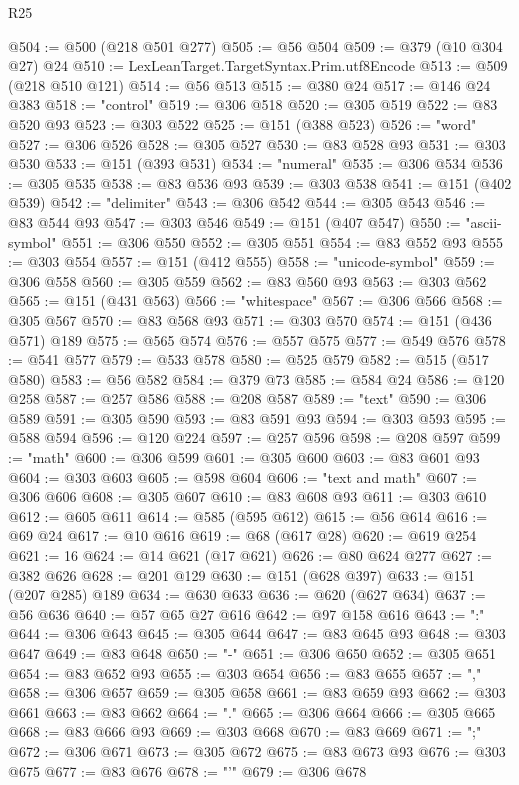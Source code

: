 \begin{lexlean}{R25}
\begin{coremodule}
@504 := @500 (@218 @501 @277)
@505 := @56 @504
@509 := @379 (@10 @304 @27) @24
@510 := LexLeanTarget.TargetSyntax.Prim.utf8Encode
@513 := @509 (@218 @510 @121)
@514 := @56 @513
@515 := @380 @24
@517 := @146 @24 @383
@518 := "control"
@519 := @306 @518
@520 := @305 @519
@522 := @83 @520 @93
@523 := @303 @522
@525 := @151 (@388 @523)
@526 := "word"
@527 := @306 @526
@528 := @305 @527
@530 := @83 @528 @93
@531 := @303 @530
@533 := @151 (@393 @531)
@534 := "numeral"
@535 := @306 @534
@536 := @305 @535
@538 := @83 @536 @93
@539 := @303 @538
@541 := @151 (@402 @539)
@542 := "delimiter"
@543 := @306 @542
@544 := @305 @543
@546 := @83 @544 @93
@547 := @303 @546
@549 := @151 (@407 @547)
@550 := "ascii-symbol"
@551 := @306 @550
@552 := @305 @551
@554 := @83 @552 @93
@555 := @303 @554
@557 := @151 (@412 @555)
@558 := "unicode-symbol"
@559 := @306 @558
@560 := @305 @559
@562 := @83 @560 @93
@563 := @303 @562
@565 := @151 (@431 @563)
@566 := "whitespace"
@567 := @306 @566
@568 := @305 @567
@570 := @83 @568 @93
@571 := @303 @570
@574 := @151 (@436 @571) @189
@575 := @565 @574
@576 := @557 @575
@577 := @549 @576
@578 := @541 @577
@579 := @533 @578
@580 := @525 @579
@582 := @515 (@517 @580)
@583 := @56 @582
@584 := @379 @73
@585 := @584 @24
@586 := @120 @258
@587 := @257 @586
@588 := @208 @587
@589 := "text"
@590 := @306 @589
@591 := @305 @590
@593 := @83 @591 @93
@594 := @303 @593
@595 := @588 @594
@596 := @120 @224
@597 := @257 @596
@598 := @208 @597
@599 := "math"
@600 := @306 @599
@601 := @305 @600
@603 := @83 @601 @93
@604 := @303 @603
@605 := @598 @604
@606 := "text and math"
@607 := @306 @606
@608 := @305 @607
@610 := @83 @608 @93
@611 := @303 @610
@612 := @605 @611
@614 := @585 (@595 @612)
@615 := @56 @614
@616 := @69 @24
@617 := @10 @616
@619 := @68 (@617 @28)
@620 := @619 @254
@621 := 16
@624 := @14 @621 (@17 @621)
@626 := @80 @624 @277
@627 := @382 @626
@628 := @201 @129
@630 := @151 (@628 @397)
@633 := @151 (@207 @285) @189
@634 := @630 @633
@636 := @620 (@627 @634)
@637 := @56 @636
@640 := @57 @65 @27 @616
@642 := @97 @158 @616
@643 := ":"
@644 := @306 @643
@645 := @305 @644
@647 := @83 @645 @93
@648 := @303 @647
@649 := @83 @648
@650 := "-"
@651 := @306 @650
@652 := @305 @651
@654 := @83 @652 @93
@655 := @303 @654
@656 := @83 @655
@657 := ","
@658 := @306 @657
@659 := @305 @658
@661 := @83 @659 @93
@662 := @303 @661
@663 := @83 @662
@664 := "."
@665 := @306 @664
@666 := @305 @665
@668 := @83 @666 @93
@669 := @303 @668
@670 := @83 @669
@671 := ";"
@672 := @306 @671
@673 := @305 @672
@675 := @83 @673 @93
@676 := @303 @675
@677 := @83 @676
@678 := "'"
@679 := @306 @678

\end{coremodule}
\end{lexlean}
